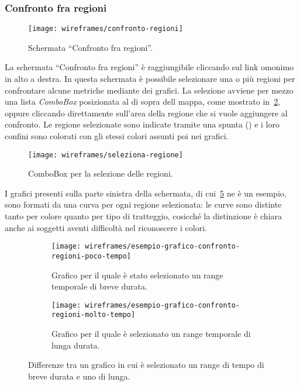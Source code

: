 \documentclass[../../../main.tex]{subfiles}
\begin{document}
\subsubsection{Confronto fra regioni}\label{ss:confronto-fra-regioni}
\begin{figure}[H]
    \centering
    \texttt{[image: wireframes/confronto-regioni]}
    \caption{Schermata ``Confronto fra regioni''.}
    \label{fig:confronto-regioni}
\end{figure}
La schermata ``Confronto fra regioni'' è raggiungibile cliccando sul link omonimo in alto a destra. In questa schermata è possibile selezionare una o più regioni per confrontare alcune metriche mediante dei grafici. La selezione avviene per mezzo una lista \textit{ComboBox} posizionata al di sopra dell mappa, come mostrato in~\ref{fig:seleziona-regione}, oppure cliccando direttamente sull'area della regione che si vuole aggiungere al confronto. Le regione selezionate sono indicate tramite una spunta (\checkmark) e i loro confini sono colorati con gli stessi colori assunti poi nei grafici.

\begin{figure}[H]
    \centering
    \texttt{[image: wireframes/seleziona-regione]}
    \caption{ComboBox per la selezione delle regioni.}
    \label{fig:seleziona-regione}
\end{figure}

I grafici presenti sulla parte sinistra della schermata, di cui~\ref{fig:esempio-grafico-confronto-regioni} ne è un esempio, sono formati da una curva per ogni regione selezionata: le curve sono distinte tanto per colore quanto per tipo di tratteggio, cosicché la distinzione è chiara anche ai soggetti aventi difficoltà nel riconoscere i colori.

\begin{figure}[H]
    \begin{subfigure}[b]{0.5\textwidth}
        \centering
        \texttt{[image: wireframes/esempio-grafico-confronto-regioni-poco-tempo]}
        \caption{Grafico per il quale è stato selezionato un range temporale di breve durata.}
        \label{fig:esempio-grafico-confronto-regioni-poco-tempo}
    \end{subfigure}
\hfill
    \begin{subfigure}[b]{0.45\textwidth}
        \centering
        \texttt{[image: wireframes/esempio-grafico-confronto-regioni-molto-tempo]}
        \caption{Grafico per il quale è selezionato un range temporale di lunga durata.}\label{fig:esempio-grafico-confronto-regioni-molto-tempo}
    \end{subfigure}
    \caption{Differenze tra un grafico in cui è selezionato un range di tempo di breve durata e uno di lunga.}
    \label{fig:esempio-grafico-confronto-regioni}
\end{figure}
\clearpage
\end{document}
